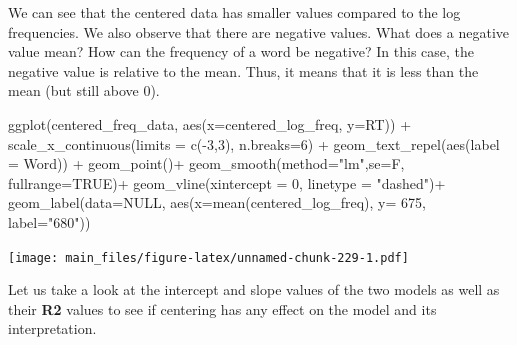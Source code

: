 \documentclass[
]{book}
\newenvironment{Shaded}{\begin{snugshade}}{\end{snugshade}}
\newcommand{\AttributeTok}[1]{\textcolor[rgb]{0.77,0.63,0.00}{#1}}
\newcommand{\ConstantTok}[1]{\textcolor[rgb]{0.00,0.00,0.00}{#1}}
\newcommand{\DecValTok}[1]{\textcolor[rgb]{0.00,0.00,0.81}{#1}}
\newcommand{\FunctionTok}[1]{\textcolor[rgb]{0.00,0.00,0.00}{#1}}
\newcommand{\NormalTok}[1]{#1}
\newcommand{\SpecialCharTok}[1]{\textcolor[rgb]{0.00,0.00,0.00}{#1}}
\newcommand{\StringTok}[1]{\textcolor[rgb]{0.31,0.60,0.02}{#1}}
\begin{document}
We can see that the centered data has smaller values compared to the log frequencies. We also observe that there are negative values. What does a negative value mean? How can the frequency of a word be negative? In this case, the negative value is relative to the mean. Thus, it means that it is less than the mean (but still above 0).

\begin{Shaded}
\begin{Highlighting}[]
\FunctionTok{ggplot}\NormalTok{(centered\_freq\_data, }\FunctionTok{aes}\NormalTok{(}\AttributeTok{x=}\NormalTok{centered\_log\_freq, }\AttributeTok{y=}\NormalTok{RT)) }\SpecialCharTok{+}
  \FunctionTok{scale\_x\_continuous}\NormalTok{(}\AttributeTok{limits =} \FunctionTok{c}\NormalTok{(}\SpecialCharTok{{-}}\DecValTok{3}\NormalTok{,}\DecValTok{3}\NormalTok{), }\AttributeTok{n.breaks=}\DecValTok{6}\NormalTok{) }\SpecialCharTok{+}
  \FunctionTok{geom\_text\_repel}\NormalTok{(}\FunctionTok{aes}\NormalTok{(}\AttributeTok{label =}\NormalTok{ Word)) }\SpecialCharTok{+}
  \FunctionTok{geom\_point}\NormalTok{()}\SpecialCharTok{+}
  \FunctionTok{geom\_smooth}\NormalTok{(}\AttributeTok{method=}\StringTok{"lm"}\NormalTok{,}\AttributeTok{se=}\NormalTok{F, }\AttributeTok{fullrange=}\ConstantTok{TRUE}\NormalTok{)}\SpecialCharTok{+}
  \FunctionTok{geom\_vline}\NormalTok{(}\AttributeTok{xintercept =} \DecValTok{0}\NormalTok{, }\AttributeTok{linetype =} \StringTok{"dashed"}\NormalTok{)}\SpecialCharTok{+}
  \FunctionTok{geom\_label}\NormalTok{(}\AttributeTok{data=}\ConstantTok{NULL}\NormalTok{, }\FunctionTok{aes}\NormalTok{(}\AttributeTok{x=}\FunctionTok{mean}\NormalTok{(centered\_log\_freq), }\AttributeTok{y=} \DecValTok{675}\NormalTok{, }\AttributeTok{label=}\StringTok{"680"}\NormalTok{))}
\end{Highlighting}
\end{Shaded}

\texttt{[image: main\_files/figure-latex/unnamed-chunk-229-1.pdf]}

Let us take a look at the intercept and slope values of the two models as well as their \textbf{R2} values to see if centering has any effect on the model and its interpretation.

\begin{Shaded}
\end{Shaded}
\end{document}

